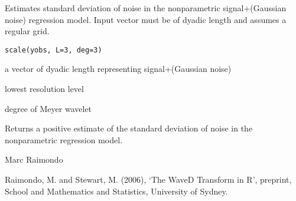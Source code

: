 \begin{Description}\relax
Estimates standard deviation of noise in the nonparametric 
signal+(Gaussian noise)
regression  model. Input vector must be of dyadic length
and assumes a regular grid.
\end{Description}
\begin{Usage}
\begin{verbatim}
scale(yobs, L=3, deg=3)
\end{verbatim}
\end{Usage}
\begin{Arguments}
\begin{ldescription}
\item[\code{yobs}] a vector of dyadic length representing signal+(Gaussian noise)
\item[\code{L}] lowest resolution level
\item[\code{deg}] degree of Meyer wavelet
\end{ldescription}
\end{Arguments}
\begin{Value}
Returns a positive 
estimate  of the standard deviation of noise in the nonparametric 
regression  model.
\end{Value}
\begin{Author}\relax
Marc Raimondo
\end{Author}
\begin{References}\relax
Raimondo, M. and Stewart, M. (2006),
`The WaveD Transform in R', preprint, School and Mathematics and Statistics,
University of Sydney.
\end{References}
\begin{SeeAlso}\relax
{}
\end{SeeAlso}
\begin{Examples}
\end{Examples}

